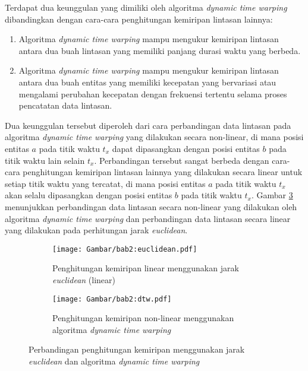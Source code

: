 Terdapat dua keunggulan yang dimiliki oleh algoritma \textit{dynamic time warping} dibandingkan dengan cara-cara penghitungan kemiripan lintasan lainnya:

\begin{enumerate}
    \item Algoritma \textit{dynamic time warping} mampu mengukur kemiripan lintasan antara dua buah lintasan yang memiliki panjang durasi waktu yang berbeda.
    \item Algoritma \textit{dynamic time warping} mampu mengukur kemiripan lintasan antara dua buah entitas yang memiliki kecepatan yang bervariasi atau mengalami perubahan kecepatan dengan frekuensi tertentu selama proses pencatatan data lintasan.
\end{enumerate}

Dua keunggulan tersebut diperoleh dari cara perbandingan data lintasan pada algoritma \textit{dynamic time warping} yang dilakukan secara non-linear, di mana posisi entitas $a$ pada titik waktu $t_x$ dapat dipasangkan dengan posisi entitas $b$ pada titik waktu lain selain $t_x$. Perbandingan tersebut sangat berbeda dengan cara-cara penghitungan kemiripan lintasan lainnya yang dilakukan secara linear untuk setiap titik waktu yang tercatat, di mana posisi entitas $a$ pada titik waktu $t_x$ akan selalu dipasangkan dengan posisi entitas $b$ pada titik waktu $t_x$. Gambar \ref{bab2:dtw-euclidean} menunjukkan perbandingan data lintasan secara non-linear yang dilakukan oleh algoritma \textit{dynamic time warping} dan perbandingan data lintasan secara linear yang dilakukan pada perhitungan jarak \textit{euclidean}.

\begin{figure}[t]
    \centering
    \begin{subfigure}[h]{0.45\textwidth}
        \centering
        \texttt{[image: Gambar/bab2:euclidean.pdf]}
        \caption{Penghitungan kemiripan linear menggunakan jarak \textit{euclidean} (linear)}
        \label{bab2:euclidean}
    \end{subfigure} \hspace{1cm}
    \begin{subfigure}[h]{0.45\textwidth}
        \centering
        \texttt{[image: Gambar/bab2:dtw.pdf]}
        \caption{Penghitungan kemiripan non-linear menggunakan algoritma \textit{dynamic time warping}}
        \label{bab2:dtw}
    \end{subfigure}
    \caption[Perbandingan kemiripan lintasan secara linear dan non-linear]{Perbandingan penghitungan kemiripan menggunakan jarak \textit{euclidean} dan algoritma \textit{dynamic time warping}}
    \label{bab2:dtw-euclidean}
\end{figure}

